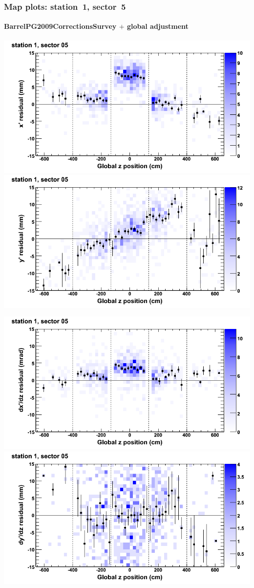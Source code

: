 \documentclass[compress]{beamer}
\begin{document}
\begin{frame}
\frametitle{Map plots: station~1, sector~5}
\framesubtitle{BarrelPG2009CorrectionsSurvey $+$ global adjustment}
\includegraphics[width=0.5\linewidth]{mapplots_re01/DTvsz_st1sec05_x.png}
\includegraphics[width=0.5\linewidth]{mapplots_re01/DTvsz_st1sec05_y.png}

\includegraphics[width=0.5\linewidth]{mapplots_re01/DTvsz_st1sec05_dxdz.png}
\includegraphics[width=0.5\linewidth]{mapplots_re01/DTvsz_st1sec05_dydz.png}
\end{frame}
\end{document}
